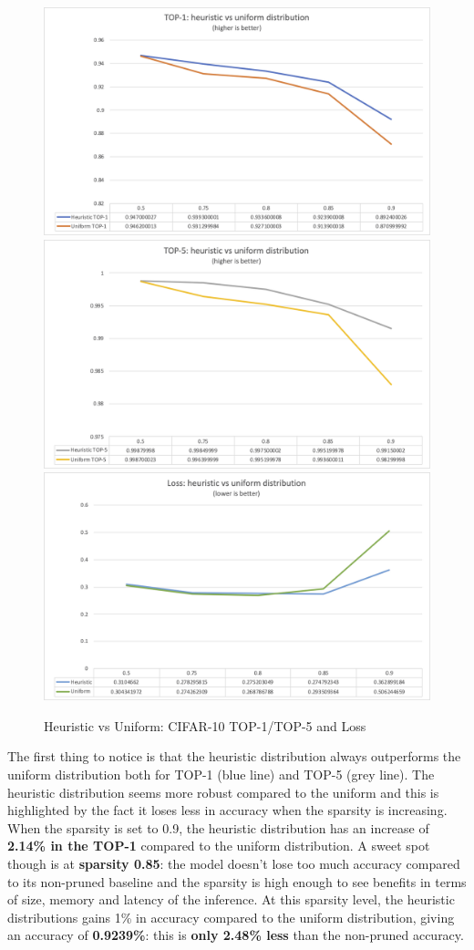 \begin{figure}
    \centering
    {\includegraphics[width=.85\linewidth]{images/results/cifar10_top1.png}}
    {\includegraphics[width=.85\linewidth]{images/results/cifar10_top5.png}}
    {\includegraphics[width=.85\linewidth]{images/results/cifar10_loss.png}}
    \caption{Heuristic vs Uniform: CIFAR-10 TOP-1/TOP-5 and Loss}\label{fig:cifar10_top1_top5_loss}
\end{figure}

The first thing to notice is that the heuristic distribution always outperforms
the uniform distribution both for TOP-1 (blue line) and TOP-5 (grey line).
The heuristic distribution seems more robust compared to the uniform and this
is highlighted by the fact it loses less in accuracy when the sparsity is
increasing.
When the sparsity is set to 0.9, the heuristic distribution has an increase of
\textbf{2.14\% in the TOP-1} compared to the uniform distribution.
A sweet spot though is at \textbf{sparsity 0.85}: the model doesn't lose too
much accuracy compared to its non-pruned baseline and the sparsity is high
enough to see benefits in terms of size, memory and latency of the inference.
At this sparsity level, the heuristic distributions gains 1\% in accuracy
compared to the uniform distribution, giving an accuracy of \textbf{0.9239\%}:
this is \textbf{only 2.48\% less} than the non-pruned accuracy.

